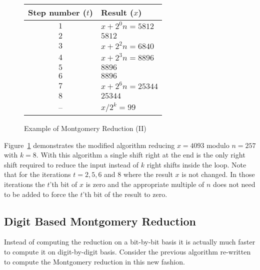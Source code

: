 \documentclass[b5paper]{book}
\begin{document}
\begin{figure}[here]
\begin{small}
\begin{center}
\begin{tabular}{|c|l|}
\hline \textbf{Step number ($t$)} & \textbf{Result ($x$)} \\
\hline $1$ & $x + 2^{0}n = 5812$ \\
\hline $2$ & $5812$ \\
\hline $3$ & $x + 2^{2}n = 6840$ \\
\hline $4$ & $x + 2^{3}n = 8896$ \\
\hline $5$ & $8896$ \\
\hline $6$ & $8896$ \\
\hline $7$ & $x + 2^{6}n = 25344$ \\
\hline $8$ & $25344$ \\
\hline -- & $x/2^k = 99$ \\
\hline
\end{tabular}
\end{center}
\end{small}
\caption{Example of Montgomery Reduction (II)}
\label{fig:MONT2}
\end{figure}

Figure~\ref{fig:MONT2} demonstrates the modified algorithm reducing $x = 4093$ modulo $n = 257$ with $k = 8$. 
With this algorithm a single shift right at the end is the only right shift required to reduce the input instead of $k$ right shifts inside the 
loop.  Note that for the iterations $t = 2, 5, 6$ and $8$ where the result $x$ is not changed.  In those iterations the $t$'th bit of $x$ is 
zero and the appropriate multiple of $n$ does not need to be added to force the $t$'th bit of the result to zero.  

\subsection{Digit Based Montgomery Reduction}
Instead of computing the reduction on a bit-by-bit basis it is actually much faster to compute it on digit-by-digit basis.  Consider the
previous algorithm re-written to compute the Montgomery reduction in this new fashion.
\end{document}
